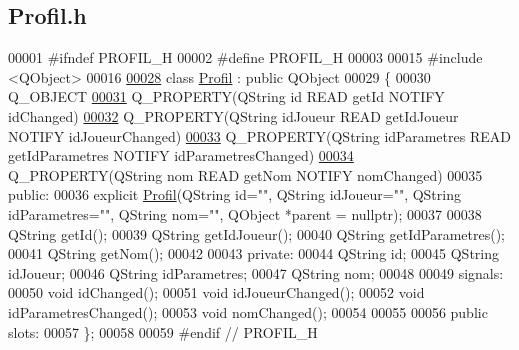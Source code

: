 \hypertarget{_profil_8h_source}{}\subsection{Profil.\+h}
\label{_profil_8h_source}

\begin{DoxyCode}
00001 \textcolor{preprocessor}{#ifndef PROFIL\_H}
00002 \textcolor{preprocessor}{#define PROFIL\_H}
00003 
00015 \textcolor{preprocessor}{#include <QObject>}
00016 
\hyperlink{class_profil}{00028} \textcolor{keyword}{class }\hyperlink{class_profil}{Profil} : \textcolor{keyword}{public} QObject
00029 \{
00030     Q\_OBJECT
\hyperlink{class_profil_ac2a62326a3156d5e67011d3dcc063e40}{00031}     Q\_PROPERTY(QString \textcolor{keywordtype}{id} READ getId NOTIFY idChanged)
\hyperlink{class_profil_a0d8277364c321a3797f91e3c32dbe47f}{00032}     Q\_PROPERTY(QString idJoueur READ getIdJoueur NOTIFY idJoueurChanged)
\hyperlink{class_profil_a2cdcb0b7614e783ba20ae93eaefebd0c}{00033}     Q\_PROPERTY(QString idParametres READ getIdParametres NOTIFY idParametresChanged)
\hyperlink{class_profil_a919585bdd5c7e7382e6a25c5152d0ca3}{00034}     Q\_PROPERTY(QString nom READ getNom NOTIFY nomChanged)
00035 public:
00036     explicit \hyperlink{class_profil}{Profil}(QString \textcolor{keywordtype}{id}="", QString idJoueur="", QString idParametres="", QString nom="", 
      QObject *parent = \textcolor{keywordtype}{nullptr});
00037 
00038     QString getId();
00039     QString getIdJoueur();
00040     QString getIdParametres();
00041     QString getNom();
00042 
00043 private:
00044     QString \textcolor{keywordtype}{id};
00045     QString idJoueur;
00046     QString idParametres;
00047     QString nom;
00048 
00049 signals:
00050     \textcolor{keywordtype}{void} idChanged();
00051     \textcolor{keywordtype}{void} idJoueurChanged();
00052     \textcolor{keywordtype}{void} idParametresChanged();
00053     \textcolor{keywordtype}{void} nomChanged();
00054 
00055 
00056 public slots:
00057 \};
00058 
00059 \textcolor{preprocessor}{#endif // PROFIL\_H}
\end{DoxyCode}
